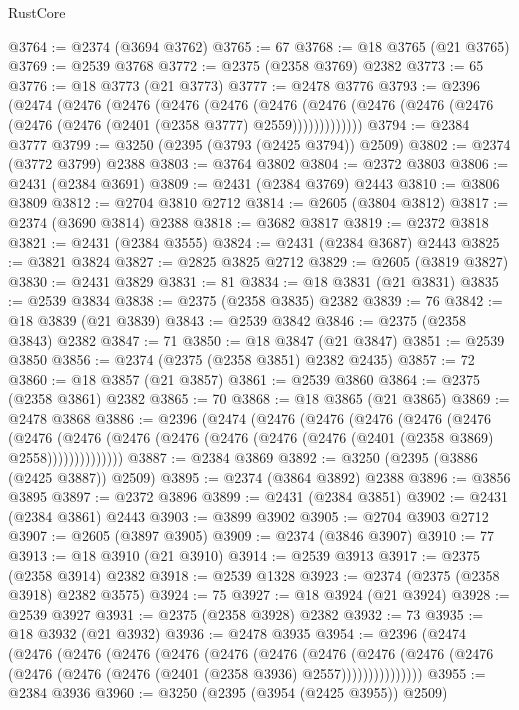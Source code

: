 \begin{lexlean}{RustCore}
\begin{coremodule}
@3764 := @2374 (@3694 @3762)
@3765 := 67
@3768 := @18 @3765 (@21 @3765)
@3769 := @2539 @3768
@3772 := @2375 (@2358 @3769) @2382
@3773 := 65
@3776 := @18 @3773 (@21 @3773)
@3777 := @2478 @3776
@3793 := @2396
    (@2474
      (@2476
        (@2476
          (@2476
            (@2476
              (@2476
                (@2476 (@2476 (@2476 (@2476 (@2476 (@2476 (@2401 (@2358 @3777) @2559)))))))))))))
@3794 := @2384 @3777
@3799 := @3250 (@2395 (@3793 (@2425 @3794)) @2509)
@3802 := @2374 (@3772 @3799) @2388
@3803 := @3764 @3802
@3804 := @2372 @3803
@3806 := @2431 (@2384 @3691)
@3809 := @2431 (@2384 @3769) @2443
@3810 := @3806 @3809
@3812 := @2704 @3810 @2712
@3814 := @2605 (@3804 @3812)
@3817 := @2374 (@3690 @3814) @2388
@3818 := @3682 @3817
@3819 := @2372 @3818
@3821 := @2431 (@2384 @3555)
@3824 := @2431 (@2384 @3687) @2443
@3825 := @3821 @3824
@3827 := @2825 @3825 @2712
@3829 := @2605 (@3819 @3827)
@3830 := @2431 @3829
@3831 := 81
@3834 := @18 @3831 (@21 @3831)
@3835 := @2539 @3834
@3838 := @2375 (@2358 @3835) @2382
@3839 := 76
@3842 := @18 @3839 (@21 @3839)
@3843 := @2539 @3842
@3846 := @2375 (@2358 @3843) @2382
@3847 := 71
@3850 := @18 @3847 (@21 @3847)
@3851 := @2539 @3850
@3856 := @2374 (@2375 (@2358 @3851) @2382 @2435)
@3857 := 72
@3860 := @18 @3857 (@21 @3857)
@3861 := @2539 @3860
@3864 := @2375 (@2358 @3861) @2382
@3865 := 70
@3868 := @18 @3865 (@21 @3865)
@3869 := @2478 @3868
@3886 := @2396
    (@2474
      (@2476
        (@2476
          (@2476
            (@2476
              (@2476
                (@2476
                  (@2476 (@2476 (@2476 (@2476 (@2476 (@2476 (@2401 (@2358 @3869) @2558))))))))))))))
@3887 := @2384 @3869
@3892 := @3250 (@2395 (@3886 (@2425 @3887)) @2509)
@3895 := @2374 (@3864 @3892) @2388
@3896 := @3856 @3895
@3897 := @2372 @3896
@3899 := @2431 (@2384 @3851)
@3902 := @2431 (@2384 @3861) @2443
@3903 := @3899 @3902
@3905 := @2704 @3903 @2712
@3907 := @2605 (@3897 @3905)
@3909 := @2374 (@3846 @3907)
@3910 := 77
@3913 := @18 @3910 (@21 @3910)
@3914 := @2539 @3913
@3917 := @2375 (@2358 @3914) @2382
@3918 := @2539 @1328
@3923 := @2374 (@2375 (@2358 @3918) @2382 @3575)
@3924 := 75
@3927 := @18 @3924 (@21 @3924)
@3928 := @2539 @3927
@3931 := @2375 (@2358 @3928) @2382
@3932 := 73
@3935 := @18 @3932 (@21 @3932)
@3936 := @2478 @3935
@3954 := @2396
    (@2474
      (@2476
        (@2476
          (@2476
            (@2476
              (@2476
                (@2476
                  (@2476
                    (@2476
                      (@2476 (@2476 (@2476 (@2476 (@2476 (@2401 (@2358 @3936) @2557)))))))))))))))
@3955 := @2384 @3936
@3960 := @3250 (@2395 (@3954 (@2425 @3955)) @2509)

\end{coremodule}
\end{lexlean}
